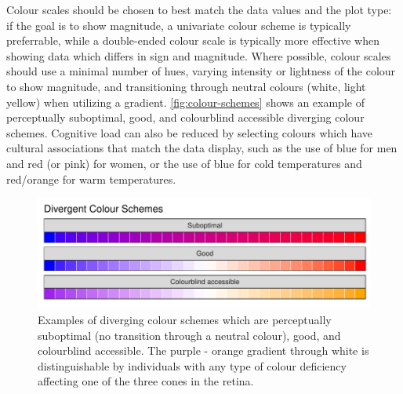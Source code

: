 \documentclass[letterpaper]{ar-1col}\usepackage[]{graphicx}\usepackage[]{color}
\newenvironment{knitrout}{}{} %
\begin{document}
Colour scales should be chosen to best match the data values and the plot type: if the goal is to show magnitude, a univariate colour scheme is typically preferrable, while a double-ended colour scale is typically more effective when showing data which differs in sign and magnitude. Where possible, colour scales should use a minimal number of hues, varying intensity or lightness of the colour to show magnitude, and transitioning through neutral colours (white, light yellow) when utilizing a gradient. \autoref{fig:colour-schemes} shows an example of perceptually suboptimal, good, and colourblind accessible diverging colour schemes. Cognitive load can also be reduced by selecting colours which have cultural associations that match the data display, such as the use of blue for men and red (or pink) for women, or the use of blue for cold temperatures and red/orange for warm temperatures.

\begin{knitrout}
\color{fgcolor}\begin{figure}
\includegraphics[width=\textwidth]{figure/colour-schemes-1} \caption[Examples of diverging colour schemes which are perceptually suboptimal (no transition through a neutral colour), good, and colourblind accessible]{Examples of diverging colour schemes which are perceptually suboptimal (no transition through a neutral colour), good, and colourblind accessible. The purple - orange gradient through white is distinguishable by individuals with any type of colour deficiency affecting one of the three cones in the retina.}\label{fig:colour-schemes}
\end{figure}


\end{knitrout}
\end{document}
